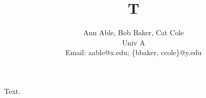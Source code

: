 \documentclass{article}
\title{T}
\author{Ann Able, Bob Baker, Cat Cole \\ Univ A \\ Email: aable@x.edu; \{bbaker, ccole\}@y.edu}
\begin{document}
\maketitle
Text.
\end{document}
